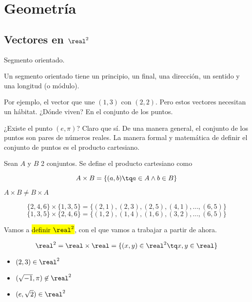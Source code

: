 
\chapter{Geometría}

\section{Vectores en $\real^2$}

\begin{defn}
Segmento orientado.
\end{defn}

\obs Un segmento orientado tiene un principio, un final, una dirección, un sentido y una longitud (o módulo).

Por ejemplo, el vector que une $(1,3)$ con $(2,2)$. Pero estos vectores necesitan un hábitat. ¿Dónde viven? En el conjunto de los puntos. 

¿Existe el punto $(e,π)$? Claro que sí. De una manera general, el conjunto de los puntos son pares de números reales. La manera formal y matemática de definir el conjunto de puntos es el producto cartesiano.

\begin{defn}
Sean $A$ y $B$ 2 conjuntos. Se define el producto cartesiano como

\[
	A\times B = \left\{ (a,b) \tq a\in A \wedge b\in B \right\}
\]
\end{defn}

\obs $A\times B \neq B\times A$

\begin{example}
\[\{2,4,6\}\times \{1,3,5\} = \{(2,1),(2,3),(2,5),(4,1),...,(6,5)\}\]
\[\{1,3,5\}\times \{2,4,6\} = \{(1,2),(1,4),(1,6),(3,2),...,(6,5)\}\]
\end{example}

Vamos a \hl{definir $\real^2$}, con el que vamos a trabajar a partir de ahora. 

\[\real^2 = \real\times\real = \{ (x,y)\in\real^2 \tq x,y\in\real\}\]

\begin{example}
	\begin{itemize}
		\item $(2,3)\in\real^2$
		\item $(\sqrt{-1},\pi)\not\in\real^2$
		\item $(e,\sqrt{2})\in\real^2$
	\end{itemize}
\end{example}


